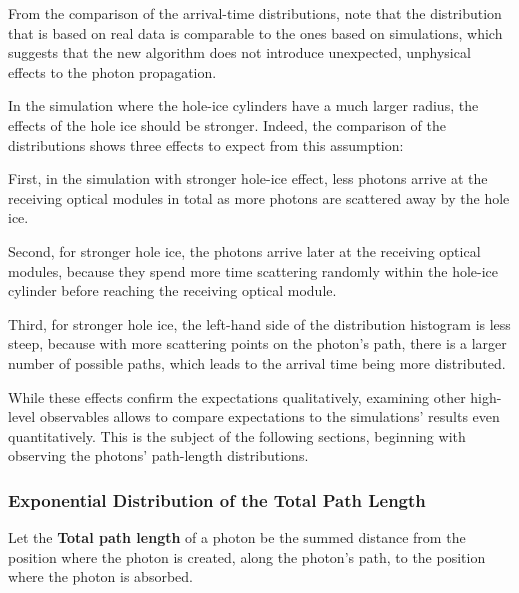 From the comparison of the arrival-time distributions, note that the distribution that is based on real data is comparable to the ones based on simulations, which suggests that the new algorithm does not introduce unexpected, unphysical effects to the photon propagation.


In the simulation where the hole-ice cylinders have a much larger radius, the effects of the hole ice should be stronger. Indeed, the comparison of the distributions shows three effects to expect from this assumption:

First, in the simulation with stronger hole-ice effect, less photons arrive at the receiving optical modules in total as more photons are scattered away by the hole ice.

Second, for stronger hole ice, the photons arrive later at the receiving optical modules, because they spend more time scattering randomly within the hole-ice cylinder before reaching the receiving optical module.

Third, for stronger hole ice, the left-hand side of the distribution histogram is less steep, because with more scattering points on the photon's path, there is a larger number of possible paths, which leads to the arrival time being more distributed.

While these effects confirm the expectations qualitatively, examining other high-level observables allows to compare expectations to the simulations' results even quantitatively. This is the subject of the following sections, beginning with observing the photons' path-length distributions.


\subsubsection{Exponential Distribution of the Total Path Length}
\label{sec:total_path_length_distribution}


Let the \textbf{Total path length} of a photon be the summed distance from the position where the photon is created, along the photon's path, to the position where the photon is absorbed.

